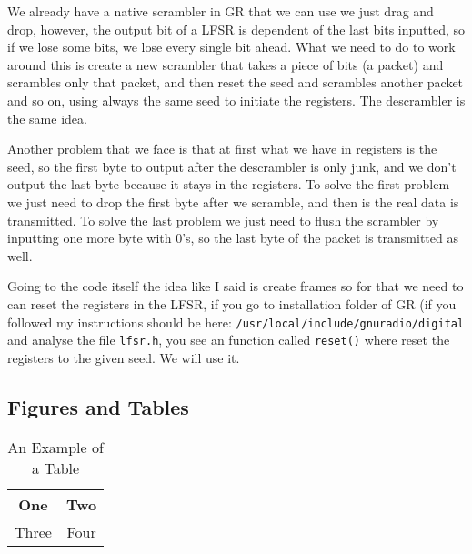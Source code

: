 \documentclass[a4paper, 10pt, conference]{ieeeconf}      %
\begin{document}
    We already have a native scrambler in GR that we can use we just drag and drop, however, the output bit of a LFSR is dependent of the last bits inputted, so if we lose some bits, we lose every single bit ahead. What we need to do to work around this is create a new scrambler that takes a piece of bits (a packet) and scrambles only that packet, and then reset the seed and scrambles another packet and so on, using always the same seed to initiate the registers. The descrambler is the same idea.
    
    Another problem that we face is that at first what we have in registers is the seed, so the first byte to output after the descrambler is only junk, and we don't output the last byte because it stays in the registers. To solve the first problem we just need to drop the first byte after we scramble, and then is the real data is transmitted. To solve the last problem we just need to flush the scrambler by inputting one more byte with 0's, so the last byte of the packet is transmitted as well.  
    
    Going to the code itself the idea like I said is create frames so for that we need to can reset the registers in the LFSR, if you go to installation folder of GR (if you followed my instructions should be here: \verb|/usr/local/include/gnuradio/digital| and analyse the file \verb|lfsr.h|, you see an function called \verb|reset()| where reset the registers to the given seed. We will use it.
    
    
    
    
    
    
    
\subsection{Figures and Tables}

\begin{table}[h]
\caption{An Example of a Table}
\label{table_example}
\begin{center}
\begin{tabular}{|c||c|}
\hline
One & Two\\
\hline
Three & Four\\
\hline
\end{tabular}
\end{center}
\end{table}
\end{document}
